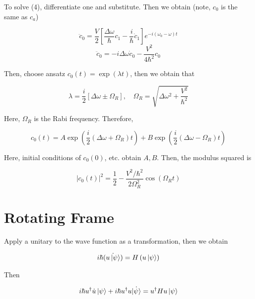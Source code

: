 \documentclass{article}
\newtheorem{one minute paper}[theorem]{One Minute Paper}
\begin{document}
To solve (4), differentiate one and substitute. Then we obtain (note, $c_0$ is the same as $c_a$)

\begin{equation}
    \ddot{c}_0 = \frac{V}{2}\left[ \frac{\Delta \omega}{\hbar}c_1 - \frac{i}{\hbar}\dot{c}_1 \right]e^{-i(\omega_0 - \omega)t}
\end{equation}
\begin{equation}
    \ddot{c}_0 = -i\Delta \omega \dot{c}_0 - \frac{V^2}{4\hbar^2}c_0
\end{equation}

Then, choose ansatz $c_0(t) = \exp(\lambda t)$, then we obtain that 

\begin{equation}
    \lambda = \frac{i}{2}\left[ \Delta \omega \pm \Omega_R \right], \quad \Omega_R = \sqrt{\Delta\omega^2 + \frac{V^2}{\hbar^2}}
\end{equation}

Here, $\Omega_R$ is the Rabi frequency. Therefore,

\begin{equation}
    c_0(t) = A\exp\left( \frac{i}{2}\left( \Delta \omega + \Omega_R \right)t \right) + B\exp\left( \frac{i}{2}(\Delta \omega- \Omega_R)t \right)
\end{equation}

Here, initial conditions of $c_0(0)$, etc. obtain $A,B$. Then, the modulus squared is 

\begin{equation}
    |c_0(t)|^2 = \frac{1}{2} - \frac{V^2/\hbar^2}{2\Omega_R^2}\cos(\Omega_R t)
\end{equation}

\section*{Rotating Frame}

Apply a unitary to the wave function as a transformation, then we obtain 

\begin{equation}
    i\hbar \dot{\left( u\ket{\psi} \right)} = H\left(u \ket{\psi} \right)
\end{equation}

Then 

\begin{equation}
    i\hbar u^{\dagger}\dot{u}\ket{\psi} + i\hbar u^{\dagger}u\dot{\ket{\psi}} = u^{\dagger}Hu\ket{\psi}
\end{equation}
\end{document}
